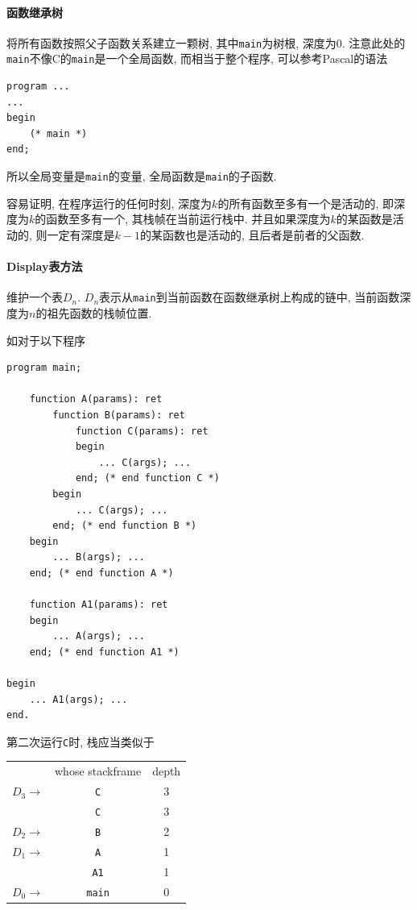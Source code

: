 \documentclass{ctexart}
\begin{document}
\paragraph{函数继承树}
    将所有函数按照父子函数关系建立一颗树,
    其中\verb/main/为树根, 深度为$0$.
    注意此处的\verb/main/不像C的\verb/main/是一个全局函数,
    而相当于整个程序, 可以参考Pascal的语法\begin{verbatim}program ...
... 
begin 
    (* main *) 
end;\end{verbatim} 所以全局变量是\verb/main/的变量, 全局函数是\verb/main/的子函数.\par
    容易证明, 在程序运行的任何时刻, 深度为$k$的所有函数至多有一个是活动的,
    即深度为$k$的函数至多有一个, 其栈帧在当前运行栈中.
    并且如果深度为$k$的某函数是活动的, 则一定有深度是$k-1$的某函数也是活动的, 且后者是前者的父函数.
\paragraph{Display表方法}
    维护一个表$D_n$.
    $D_n$表示从\verb/main/到当前函数在函数继承树上构成的链中,
    当前函数深度为$n$的祖先函数的栈帧位置.\par
    如对于以下程序\pagebreak
\begin{Verbatim}[samepage=true]
program main;

    function A(params): ret
        function B(params): ret
            function C(params): ret
            begin
                ... C(args); ...
            end; (* end function C *)
        begin
            ... C(args); ...
        end; (* end function B *)
    begin
        ... B(args); ...
    end; (* end function A *)

    function A1(params): ret
    begin
        ... A(args); ...
    end; (* end function A1 *)

begin
    ... A1(args); ...
end.
\end{Verbatim}
第二次运行\verb/C/时, 栈应当类似于\\
    \begin{center}\begin{tabularx}{0.6\textwidth}{r|C|c|}
        & whose stackframe & depth\\
        $D_3 \to$ & \verb/C/ & 3
        \\
        & \verb/C/ & 3
        \\
        $D_2 \to$ & \verb/B/ & 2
        \\
        $D_1 \to$ & \verb/A/ & 1
        \\
        & \verb/A1/ & 1
        \\
        $D_0 \to$ & \verb/main/ & 0
        \\
    \end{tabularx}
    \end{center}
\end{document}

